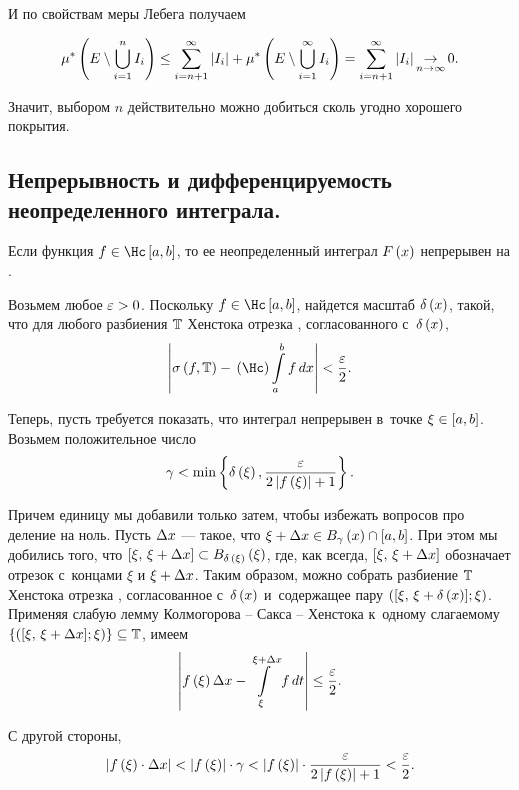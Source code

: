\documentclass[draft]{article}
\begin{document}
И по свойствам меры Лебега получаем

$$\mes\at(E\setminus\bigcup\limits_{i=1}^n I_i)\le
  \sum_{i=n+1}^\infty  \abs{I_i}+\mes\at
(E\setminus\bigcup\limits_{i=1}^\infty
I_i)=  \sum_{i=n+1}^\infty  \abs{I_i}
\mathop{\to}\limits_{n\rightarrow\infty}0.$$

Значит, выбором $n$ действительно можно добиться сколь угодно
хорошего покрытия.

\primp

\eject



\subsection{Непрерывность и дифференцируемость неопределенного
интеграла.}

\bigskip


Если функция $f\iskurzh[a,b]$, то ее неопределенный интеграл $F\atx$
непрерывен на \ab.

\pr

Возьмем любое $\varepsilon > 0$. Поскольку $f\iskurzh[a,b]$, найдется масштаб
$\dex$, такой, что для любого разбиения $\mathbb{T}$ Хенстока отрезка \ab,
согласованного с~$\dex$,
$$\abs{\isfT-\kurzh\intabfdx}<{\ep\over2}.$$

Теперь, пусть требуется показать, что интеграл непрерывен в~точке
$\xi\in\segab$. Возьмем положительное число
$$\gamma<\min\set{\de\at(\xi),{\ep\over2\abs{f\at(\xi)}+1}}.$$

Причем единицу мы добавили только затем, чтобы избежать вопросов про
деление на ноль. Пусть $\Delta x$ --- такое, что $\xi+\dx\in
B_\gamma\atx\cap\segab$. При этом мы добились того, что
$\seg[\xi,\,\xi + \dx]\subset B_{\de\,\at(\xi)}\at(\xi)$, где, как
всегда, $\seg[\xi,\,\xi+\dx]$ обозначает отрезок с~концами $\xi$ и
$\xi + \Delta x$. Таким образом, можно собрать разбиение $\mathbb{T}$ Хенстока
отрезка \ab, согласованное с~$\dex$ и~содержащее пару
$\pair(\seg[\xi,\,\xi + \dex];\xi)$. Применяя слабую лемму
Колмогорова -- Сакса -- Хенстока к~одному слагаемому
$\set{\pair(\seg[\xi,\,\xi + \dx];\xi)}\subseteq\T$, имеем
$$\abs{f\at(\xi)\dx-   \intd[\xi,\xi+\dx]   f,t}\le{\ep\over2}.$$

С другой стороны,
$$\abs{f\at(\xi)\cdot\dx}<\abs{f\at(\xi)}\cdot\gamma<
\abs{f\at(\xi)}\cdot{\ep\over2\abs{f\at(\xi)}+1}<{\ep\over2}.$$
\end{document}
